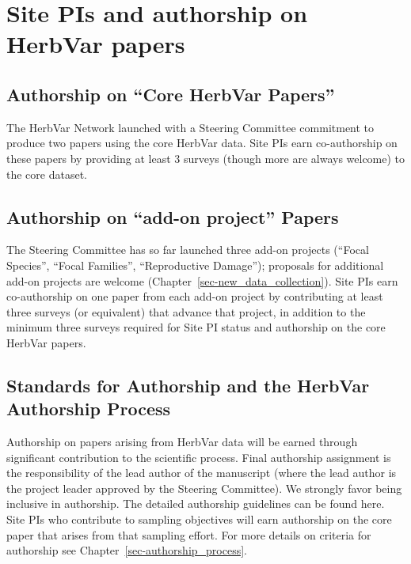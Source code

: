 \documentclass[
  letterpaper,
  oneside,
  open=any]{scrbook}
\begin{document}
\chapter{Site PIs and authorship on HerbVar
papers}\label{site-pis-and-authorship-on-herbvar-papers}

\section{Authorship on ``Core HerbVar
Papers''}\label{authorship-on-core-herbvar-papers}

The HerbVar Network launched with a Steering Committee commitment to
produce two papers using the core HerbVar data. Site PIs earn
co-authorship on these papers by providing at least 3 surveys (though
more are always welcome) to the core dataset.

\section{Authorship on ``add-on project''
Papers}\label{authorship-on-add-on-project-papers}

The Steering Committee has so far launched three add-on projects
(``Focal Species'', ``Focal Families'', ``Reproductive Damage'');
proposals for additional add-on projects are welcome
(Chapter~\ref{sec-new_data_collection}). Site PIs earn co-authorship on
one paper from each add-on project by contributing at least three
surveys (or equivalent) that advance that project, in addition to the
minimum three surveys required for Site PI status and authorship on the
core HerbVar papers.

\section{Standards for Authorship and the HerbVar Authorship
Process}\label{standards-for-authorship-and-the-herbvar-authorship-process}

Authorship on papers arising from HerbVar data will be earned through
significant contribution to the scientific process. Final authorship
assignment is the responsibility of the lead author of the manuscript
(where the lead author is the project leader approved by the Steering
Committee). We strongly favor being inclusive in authorship. The
detailed authorship guidelines can be found here. Site PIs who
contribute to sampling objectives will earn authorship on the core paper
that arises from that sampling effort. For more details on criteria for
authorship see Chapter~\ref{sec-authorship_process}.
\end{document}
